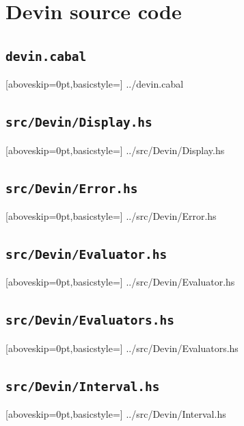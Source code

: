 \documentclass[UdineBachThesis,american,11pt,draft]{PhdThesis}
\begin{document}
  \backmatter


  \appendix

  \chapter{Devin source code}

  \section{\texttt{devin.cabal}}

  
    [aboveskip=0pt,basicstyle=\ttfamily\footnotesize]
    {../devin.cabal}

  \section{\texttt{src/Devin/Display.hs}}

  
    [aboveskip=0pt,basicstyle=\ttfamily\footnotesize]
    {../src/Devin/Display.hs}

  \section{\texttt{src/Devin/Error.hs}}

  
    [aboveskip=0pt,basicstyle=\ttfamily\footnotesize]
    {../src/Devin/Error.hs}

  \section{\texttt{src/Devin/Evaluator.hs}}

  
    [aboveskip=0pt,basicstyle=\ttfamily\footnotesize]
    {../src/Devin/Evaluator.hs}

  \section{\texttt{src/Devin/Evaluators.hs}}

  
    [aboveskip=0pt,basicstyle=\ttfamily\footnotesize]
    {../src/Devin/Evaluators.hs}

  \section{\texttt{src/Devin/Interval.hs}}

  
    [aboveskip=0pt,basicstyle=\ttfamily\footnotesize]
    {../src/Devin/Interval.hs}
\end{document}
